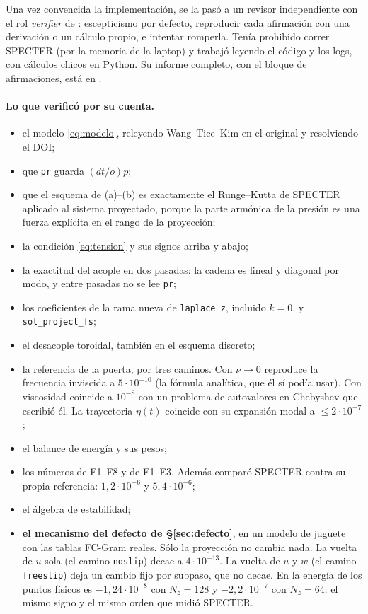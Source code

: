 Una vez convencida la implementación, se la pasó a un revisor independiente con el rol
\emph{verifier} de : escepticismo por defecto,
reproducir cada afirmación con una derivación o un cálculo propio, e intentar romperla. Tenía
prohibido correr SPECTER (por la memoria de la laptop) y trabajó leyendo el código y los logs,
con cálculos chicos en Python. Su informe completo, con el bloque de afirmaciones, está en
.

\paragraph{Lo que verificó por su cuenta.}
\begin{itemize}
\item el modelo \eqref{eq:modelo}, releyendo Wang--Tice--Kim en el original y resolviendo el
  DOI;
\item que \texttt{pr} guarda $(dt/o)p$;
\item que el esquema de (a)--(b) es exactamente el Runge--Kutta de SPECTER aplicado al
  sistema proyectado, porque la parte armónica de la presión es una fuerza explícita en el
  rango de la proyección;
\item la condición \eqref{eq:tension} y sus signos arriba y abajo;
\item la exactitud del acople en dos pasadas: la cadena es lineal y diagonal por modo, y entre
  pasadas no se lee \texttt{pr};
\item los coeficientes de la rama nueva de \texttt{laplace\_z}, incluido $k=0$, y
  \texttt{sol\_project\_fs};
\item el desacople toroidal, también en el esquema discreto;
\item la referencia de la puerta, por tres caminos. Con $\nu\to0$ reproduce la frecuencia
  inviscida a $5\cdot10^{-10}$ (la fórmula analítica, que él sí podía usar). Con viscosidad
  coincide a $10^{-8}$ con un problema de autovalores en Chebyshev que escribió él. La
  trayectoria $\eta(t)$ coincide con su expansión modal a $\le2\cdot10^{-7}$;
\item el balance de energía y sus pesos;
\item los números de F1--F8 y de E1--E3. Además comparó SPECTER contra su propia referencia:
  $1{,}2\cdot10^{-6}$ y $5{,}4\cdot10^{-6}$;
\item el álgebra de estabilidad;
\item \textbf{el mecanismo del defecto de §\ref{sec:defecto}}, en un modelo de juguete con
  las tablas FC-Gram reales. Sólo la proyección no cambia nada. La vuelta de $u$ sola (el
  camino \texttt{noslip}) decae a $4\cdot10^{-13}$. La vuelta de $u$ y $w$ (el camino
  \texttt{freeslip}) deja un cambio fijo por subpaso, que no decae. En la energía de los
  puntos físicos es $-1{,}24\cdot10^{-8}$ con $N_z=128$ y $-2{,}2\cdot10^{-7}$ con $N_z=64$:
  el mismo signo y el mismo orden que midió SPECTER.
\end{itemize}

